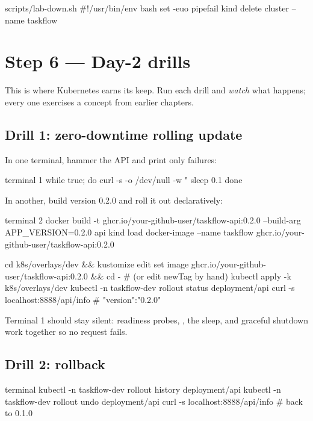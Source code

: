 \begin{bashcode}{scripts/lab-down.sh}
#!/usr/bin/env bash
set -euo pipefail
kind delete cluster --name taskflow
\end{bashcode}

\section{Step 6 --- Day-2 drills}

This is where Kubernetes earns its keep. Run each drill and \emph{watch} what
happens; every one exercises a concept from earlier chapters.

\subsection{Drill 1: zero-downtime rolling update}

In one terminal, hammer the API and print only failures:

\begin{bashcode}{terminal 1}
while true; do
  curl -s -o /dev/null -w "%
  sleep 0.1
done
\end{bashcode}

In another, build version 0.2.0 and roll it out declaratively:

\begin{bashcode}{terminal 2}
docker build -t ghcr.io/your-github-user/taskflow-api:0.2.0 --build-arg APP_VERSION=0.2.0 api
kind load docker-image --name taskflow ghcr.io/your-github-user/taskflow-api:0.2.0

cd k8s/overlays/dev && kustomize edit set image ghcr.io/your-github-user/taskflow-api:0.2.0 && cd -
#   (or edit newTag by hand)
kubectl apply -k k8s/overlays/dev
kubectl -n taskflow-dev rollout status deployment/api
curl -s localhost:8888/api/info                   # "version":"0.2.0"
\end{bashcode}

Terminal 1 should stay silent: readiness probes, , the
 sleep, and graceful shutdown work together so no request fails.

\subsection{Drill 2: rollback}

\begin{bashcode}{terminal}
kubectl -n taskflow-dev rollout history deployment/api
kubectl -n taskflow-dev rollout undo deployment/api
curl -s localhost:8888/api/info                   # back to 0.1.0
\end{bashcode}

